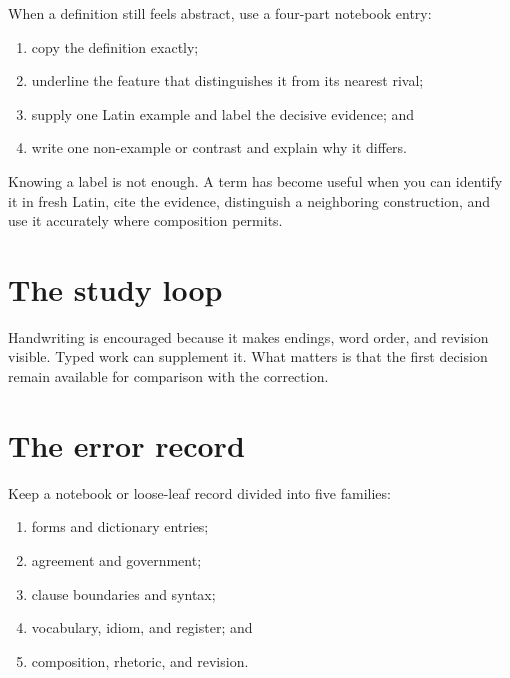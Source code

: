 
When a definition still feels abstract, use a four-part notebook entry:

\begin{enumerate}
  \item copy the definition exactly;
  \item underline the feature that distinguishes it from its nearest rival;
  \item supply one Latin example and label the decisive evidence; and
  \item write one non-example or contrast and explain why it differs.
\end{enumerate}

Knowing a label is not enough. A term has become useful when you can identify
it in fresh Latin, cite the evidence, distinguish a neighboring construction,
and use it accurately where composition permits.

\section{The study loop}

\StudyLoop

Handwriting is encouraged because it makes endings, word order, and revision
visible. Typed work can supplement it. What matters is that the first decision
remain available for comparison with the correction.

\section{The error record}

Keep a notebook or loose-leaf record divided into five families:

\begin{enumerate}
  \item forms and dictionary entries;
  \item agreement and government;
  \item clause boundaries and syntax;
  \item vocabulary, idiom, and register; and
  \item composition, rhetoric, and revision.
\end{enumerate}

